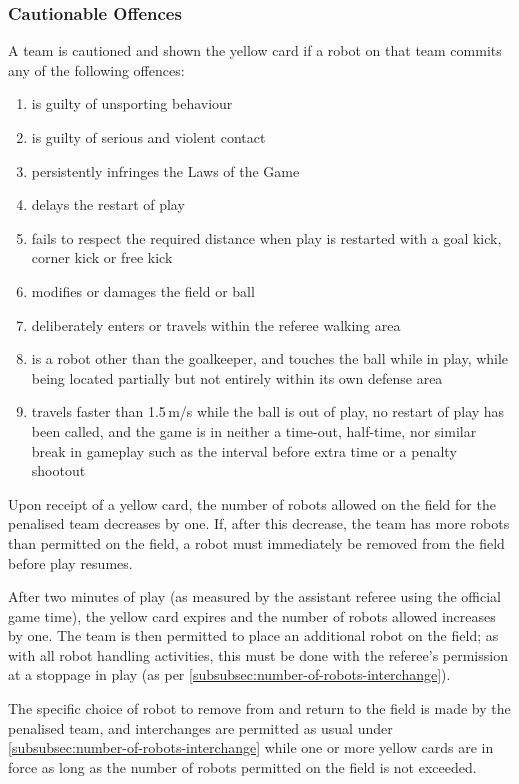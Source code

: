 \subsubsection{Cautionable Offences}
A team is cautioned and shown the yellow card if a robot on that team commits any of the following offences:
\begin{enumerate}
\item is guilty of unsporting behaviour
\item is guilty of serious and violent contact
\item persistently infringes the Laws of the Game
\item delays the restart of play
\item fails to respect the required distance when play is restarted with a goal kick, corner kick or free kick
\item modifies or damages the field or ball
\item deliberately enters or travels within the referee walking area
\item is a robot other than the goalkeeper, and touches the ball while in play, while being located partially but not entirely within its own defense area
\item {} travels faster than 1.5\,m/s while the ball is
out of play, no restart of play has been called, and the game is in neither a
time-out, half-time, nor similar break in gameplay such as the interval before
extra time or a penalty shootout
\end{enumerate}

Upon receipt of a yellow card, the number of robots allowed on the field for the penalised team decreases by one.
If, after this decrease, the team has more robots than permitted on the field, a robot must immediately be removed from the field before play resumes.

After two minutes of play (as measured by the assistant referee using the official game time), the yellow card expires and the number of robots allowed increases by one.
The team is then permitted to place an additional robot on the field; as with all robot handling activities, this must be done with the referee's permission at a stoppage in play (as per \autoref{subsubsec:number-of-robots-interchange}).

The specific choice of robot to remove from and return to the field is made by the penalised team, and interchanges are permitted as usual under \autoref{subsubsec:number-of-robots-interchange} while one or more yellow cards are in force as long as the number of robots permitted on the field is not exceeded.

